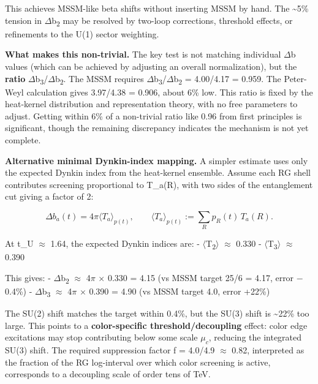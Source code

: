 \documentclass[11pt,a4paper]{article}
\theoremstyle{remark}
\begin{document}
This achieves MSSM-like beta shifts without inserting MSSM by hand. The \textasciitilde5\% tension in \ensuremath{\Delta}b\textsubscript{2} may be resolved by two-loop corrections, threshold effects, or refinements to the U(1) sector weighting.

\textbf{What makes this non-trivial.} The key test is not matching individual \ensuremath{\Delta}b values (which can be achieved by adjusting an overall normalization), but the \textbf{ratio} \ensuremath{\Delta}b\textsubscript{3}/\ensuremath{\Delta}b\textsubscript{2}. The MSSM requires \ensuremath{\Delta}b\textsubscript{3}/\ensuremath{\Delta}b\textsubscript{2} = 4.00/4.17 = 0.959. The Peter-Weyl calculation gives 3.97/4.38 = 0.906, about 6\% low. This ratio is fixed by the heat-kernel distribution and representation theory, with no free parameters to adjust. Getting within 6\% of a non-trivial ratio like 0.96 from first principles is significant, though the remaining discrepancy indicates the mechanism is not yet complete.

\textbf{Alternative minimal Dynkin-index mapping.} A simpler estimate uses only the expected Dynkin index from the heat-kernel ensemble. Assume each RG shell contributes screening proportional to T\_a(R), with two sides of the entanglement cut giving a factor of 2:

\[
\Delta b_a(t) = 4\pi \langle T_a \rangle_{p(t)}, \qquad
\langle T_a \rangle_{p(t)} := \sum_R p_R(t) \, T_a(R).
\]

At t\_U \ensuremath{\approx} 1.64, the expected Dynkin indices are:
- \ensuremath{\langle}T\textsubscript{2}\ensuremath{\rangle} \ensuremath{\approx} 0.330
- \ensuremath{\langle}T\textsubscript{3}\ensuremath{\rangle} \ensuremath{\approx} 0.390

This gives:
- \ensuremath{\Delta}b\textsubscript{2} \ensuremath{\approx} 4\ensuremath{\pi} \ensuremath{\times} 0.330 = 4.15 (vs MSSM target 25/6 = 4.17, error \ensuremath{-}0.4\%)
- \ensuremath{\Delta}b\textsubscript{3} \ensuremath{\approx} 4\ensuremath{\pi} \ensuremath{\times} 0.390 = 4.90 (vs MSSM target 4.0, error +22\%)

The SU(2) shift matches the target within 0.4\%, but the SU(3) shift is \textasciitilde22\% too large. This points to a \textbf{color-specific threshold/decoupling} effect: color edge excitations may stop contributing below some scale \(\mu_c\), reducing the integrated SU(3) shift. The required suppression factor f = 4.0/4.9 \ensuremath{\approx} 0.82, interpreted as the fraction of the RG log-interval over which color screening is active, corresponds to a decoupling scale of order tens of TeV.
\end{document}
